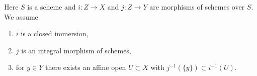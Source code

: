 \begin{situation}
\label{situation-pushout-along-closed-immersion-and-integral}
Here $S$ is a scheme and $i : Z \to X$ and $j : Z \to Y$
are morphisms of schemes over $S$. We assume
\begin{enumerate}
\item $i$ is a closed immersion,
\item $j$ is an integral morphism of schemes,
\item for $y \in Y$ there exists an affine open $U \subset X$
with $j^{-1}(\{y\}) \subset i^{-1}(U)$.
\end{enumerate}
\end{situation}
